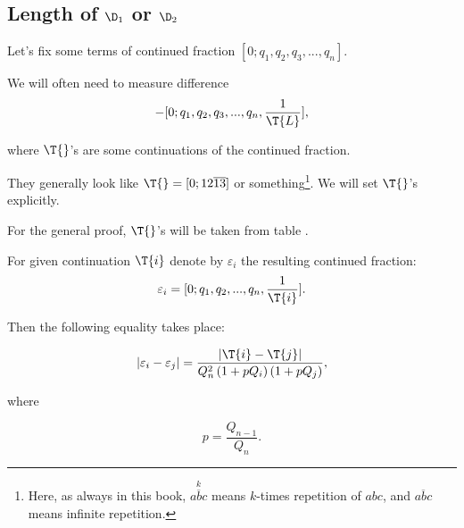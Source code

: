 \subsection{Length of $\D_1$ or $\D_2$}

Let's fix some terms of continued fraction $[0; q_1, q_2, q_3, ..., q_n]$.

We will often need to measure difference
\begin{equation*}
	[0; q_1, q_2, q_3, ..., q_n, \frac{1}{\T{R}}] - 
	[0; q_1, q_2, q_3, ..., q_n, \frac{1}{\T{L}}],
\end{equation*}

where $\T{}$'s are some continuations of the continued fraction.

They generally look like $\T{} = [0;12\overline{13}]$ or something\footnote{%
	Here, as always in this book, $\overset{k}{\overline{abc}}$
	means $k$-times repetition of $abc$,
	and $\overline{abc}$ means infinite repetition.}.
We will set $\T{}$'s explicitly.

For the general proof, $\T{}$'s will be taken from table .

\begin{designation}
	For given continuation $\T{i}$ denote by $\varepsilon_i$ the resulting continued fraction:
	\begin{equation}\label{epsilon_rule}
		\varepsilon_i = [0; q_1, q_2, ..., q_n, \frac{1}{\T{i}}].
	\end{equation}
\end{designation}

Then the following equality takes place:

\begin{equation}\label{varepsilons_difference}
	| \varepsilon_i - \varepsilon_j | = 
	\dfrac{| \T{i} - \T{j} |}
	{Q_n^2 \left(1 + pQ_i\right) \left(1 + pQ_j\right)},
\end{equation}

where

\begin{equation*}
	p = \dfrac{Q_{n-1}}{Q_n}.
\end{equation*}
